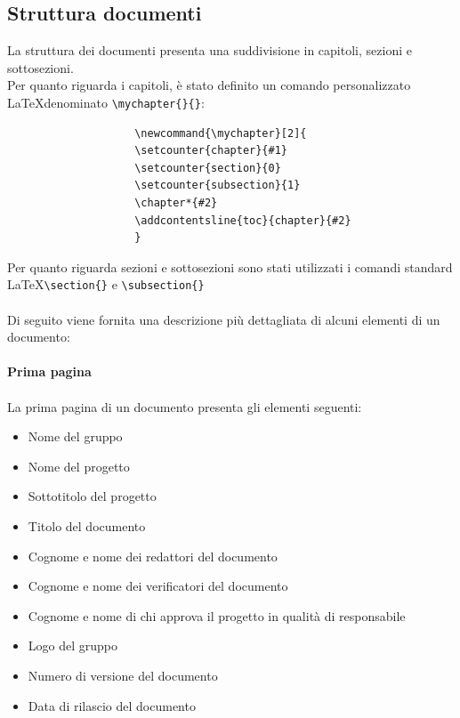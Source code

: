 \documentclass[a4paper]{report}
\newcommand{\mychapter}[2]{
    \setcounter{chapter}{#1}
    \setcounter{section}{0}
    \setcounter{subsection}{1}
    \chapter*{#2}
    \addcontentsline{toc}{chapter}{#2}
}
\begin{document}
			\subsection{Struttura documenti}
				La struttura dei documenti presenta una suddivisione in capitoli, sezioni e sottosezioni. \\
				Per quanto riguarda i capitoli, è stato definito un comando personalizzato \LaTeX \space denominato
				 \verb|\mychapter{}{}|:
				\begin{verbatim}
					\newcommand{\mychapter}[2]{
    				\setcounter{chapter}{#1}
    				\setcounter{section}{0}
    				\setcounter{subsection}{1}
    				\chapter*{#2}
    				\addcontentsline{toc}{chapter}{#2}
					}
				\end{verbatim}
				Per quanto riguarda sezioni e sottosezioni sono stati utilizzati i comandi standard \LaTeX \verb|\section{}| e
				 \verb|\subsection{}| \\ \\
				Di seguito viene fornita una descrizione più dettagliata di alcuni elementi di un documento: \\ \\
				\textbf{Prima pagina} \\ \\ 
					La prima pagina di un documento presenta gli elementi seguenti:
					\begin{itemize}
						\item Nome del gruppo
						\item Nome del progetto
						\item Sottotitolo del progetto
						\item Titolo del documento
						\item Cognome e nome dei redattori del documento
						\item Cognome e nome dei verificatori del documento
						\item Cognome e nome di chi approva il progetto in qualità di responsabile
						\item Logo del gruppo
						\item Numero di versione del documento
						\item Data di rilascio del documento
					\end{itemize}
\end{document}
